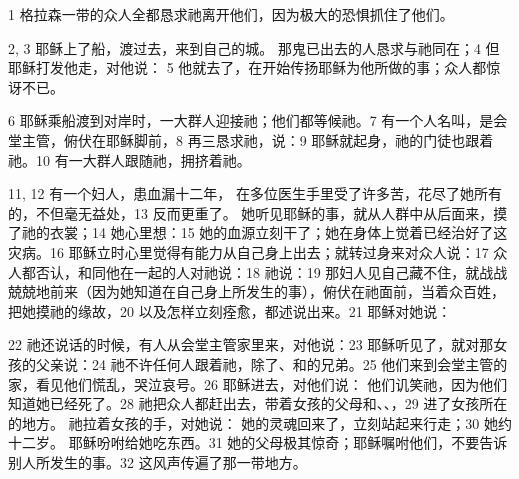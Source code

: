 1  格拉森一带的众人全都恳求祂离开他们，因为极大的恐惧抓住了他们。\par

2, 3  耶稣上了船，渡过去，来到自己的城。 那鬼已出去的人恳求与祂同在；4 但耶稣打发他走，对他说： 5  他就去了，在开始传扬耶稣为他所做的事；众人都惊讶不已。\par

6 耶稣乘船渡到对岸时，一大群人迎接祂；他们都等候祂。7  有一个人名叫，是会堂主管，俯伏在耶稣脚前，8  再三恳求祂，说：9  耶稣就起身，祂的门徒也跟着祂。10  有一大群人跟随祂，拥挤着祂。\par

11, 12  有一个妇人，患血漏十二年， 在多位医生手里受了许多苦，花尽了她所有的，不但毫无益处，13 反而更重了。 她听见耶稣的事，就从人群中从后面来，摸了祂的衣裳；14   她心里想：15  她的血源立刻干了；她在身体上觉着已经治好了这灾病。16  耶稣立时心里觉得有能力从自己身上出去；就转过身来对众人说：17  众人都否认，和同他在一起的人对祂说：18  祂说：19  那妇人见自己藏不住，就战战兢兢地前来（因为她知道在自己身上所发生的事），俯伏在祂面前，当着众百姓，把她摸祂的缘故，20 以及怎样立刻痊愈，都述说出来。21 耶稣对她说：\par

22  祂还说话的时候，有人从会堂主管家里来，对他说：23  耶稣听见了，就对那女孩的父亲说：24  祂不许任何人跟着祂，除了、和的兄弟。25  他们来到会堂主管的家，看见他们慌乱，哭泣哀号。26  耶稣进去，对他们说： 他们讥笑祂，因为他们知道她已经死了。28  祂把众人都赶出去，带着女孩的父母和、、，29 进了女孩所在的地方。 祂拉着女孩的手，对她说： 她的灵魂回来了，立刻站起来行走；30  她约十二岁。 耶稣吩咐给她吃东西。31  她的父母极其惊奇；耶稣嘱咐他们，不要告诉别人所发生的事。32  这风声传遍了那一带地方。\par

